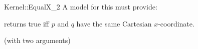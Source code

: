 \begin{ccRefFunctionObjectConcept}{Kernel::EqualX_2}
A model for this must provide:


{returns true iff $p$ and $q$ have the same Cartesian $x$-coordinate.}

\ccRefines
{} (with two arguments)

\ccSeeAlso
{}\\

\end{ccRefFunctionObjectConcept}
